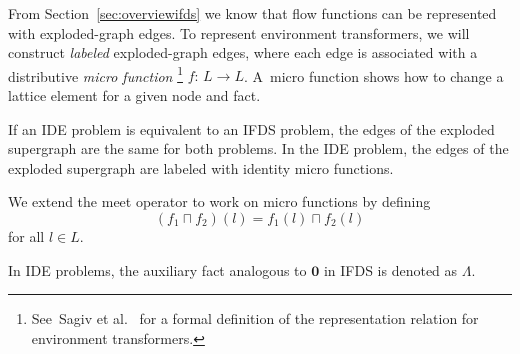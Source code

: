 From Section~\ref{sec:overviewifds} we know that flow functions can be represented with exploded-graph edges. To represent environment transformers, we will construct \textit{labeled} exploded-graph edges, where each edge is associated with a distributive \textit{micro function}%
\footnote{See~Sagiv et al.~\cite{sagiv1996precise} for a formal definition of the representation relation for environment transformers.}
$f:\,L\to L$. A~micro function shows how to change a lattice element for a given node and fact.

If an IDE problem is equivalent to an IFDS problem, the edges of the exploded supergraph are the same for both problems. In the IDE problem, the edges of the exploded supergraph are labeled with identity micro functions.

We extend the meet operator to work on micro functions by defining
\begin{equation}
  (f_1\sqcap f_2)(l)=f_1(l)\sqcap f_2(l)
\end{equation}
for all $l\in L$.

In IDE problems, the auxiliary fact analogous to $\mathbf0$ in IFDS is denoted as $\Lambda$.

